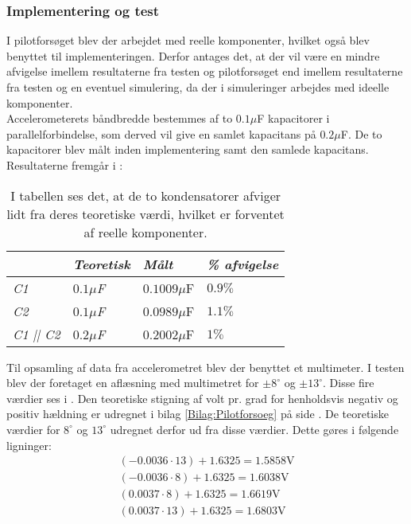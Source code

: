 \subsubsection{Implementering og test}
I pilotforsøget blev der arbejdet med reelle komponenter, hvilket også blev benyttet til implementeringen. Derfor antages det, at der vil være en mindre afvigelse imellem resultaterne fra testen og pilotforsøget end imellem resultaterne fra testen og en eventuel simulering, da der i simuleringer arbejdes med ideelle komponenter.\\
Accelerometerets båndbredde bestemmes af to $0.1\mu$F kapacitorer i parallelforbindelse, som derved vil give en samlet kapacitans på  $0.2\mu$F. De to kapacitorer blev målt inden implementering samt den samlede kapacitans. Resultaterne fremgår i  :
\begin{table}[H]
	\centering
	\begin{tabular}{|l|l|l|l|}\hline
		& \textit{Teoretisk} & \textit{Målt} & \textit{\% afvigelse} \\ \hline
		\textit{C1}       & \textit{$0.1\mu$F} & $0.1009\mu$F  & $0.9\%$               \\ \hline
		\textit{C2}       & \textit{$0.1\mu$F} & $0.0989\mu$F  & $1.1\%$               \\ \hline
		\textit{C1 || C2} & \textit{$0.2\mu$F} & $0.2002\mu$F  & $1\%$                \\ \hline
	\end{tabular}
		\caption{I tabellen ses det, at de to kondensatorer afviger lidt fra deres teoretiske værdi, hvilket er forventet af reelle komponenter.}
		\label{Tab:Acc_kondensator}
\end{table}
Til opsamling af data fra accelerometret blev der benyttet et multimeter. I testen blev der foretaget en aflæsning med multimetret for $\pm8^\circ$ og $\pm13^\circ$. Disse fire værdier ses i . Den teoretiske stigning af volt pr. grad for henholdsvis negativ og positiv hældning er udregnet i bilag \ref{Bilag:Pilotforsoeg} på side \pageref{Bilag:Pilotforsoeg}. De teoretiske værdier for $8^\circ$ og $13^\circ$ udregnet derfor ud fra disse værdier. Dette gøres i følgende ligninger:
\begin{align}
(-0.0036 \cdot 13) + 1.6325 = 1.5858\text{V} \\
(-0.0036 \cdot 8) + 1.6325 = 1.6038\text{V}  \\
(0.0037 \cdot 8) + 1.6325 = 1.6619\text{V}  \\
(0.0037 \cdot 13) + 1.6325 = 1.6803\text{V}
\end{align}
